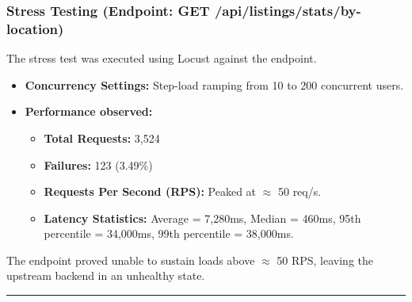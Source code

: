 \documentclass[11pt,a4paper]{article}
\begin{document}
\subsubsection*{Stress Testing (Endpoint: GET /api/listings/stats/by-location)}
The stress test was executed using Locust against the endpoint.
\begin{itemize}
    \item \textbf{Concurrency Settings:} Step-load ramping from 10 to 200 concurrent users.
    \item \textbf{Performance observed:}
    \begin{itemize}
        \item \textbf{Total Requests:} 3,524
        \item \textbf{Failures:} 123 (3.49\%)
        \item \textbf{Requests Per Second (RPS):} Peaked at $\approx$ 50 req/s.
        \item \textbf{Latency Statistics:} Average = 7,280ms, Median = 460ms, 95th percentile = 34,000ms, 99th percentile = 38,000ms.
    \end{itemize}
\end{itemize}
The endpoint proved unable to sustain loads above $\approx$ 50 RPS, leaving the upstream backend in an unhealthy state.

\vspace{1cm}
\hrule
\vspace{1cm}
\end{document}

